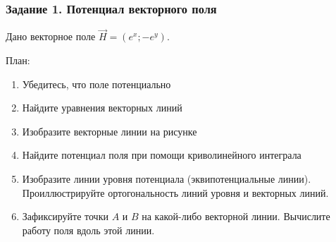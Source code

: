 \begin{frame}\frametitle{Задание 1. Потенциал векторного поля}
  Дано векторное поле \( \vec H = \left( e^x; -e^y \right) \).

План:
\begin{enumerate}
  \item Убедитесь, что поле потенциально
  \item Найдите уравнения векторных линий
  \item Изобразите векторные линии на рисунке
  \item Найдите потенциал поля при помощи криволинейного интеграла
  \item Изобразите линии уровня потенциала (эквипотенциальные линии).
  Проиллюстрируйте ортогональность линий уровня и векторных линий.
  \item Зафиксируйте точки \( A \) и \( B \) на какой-либо векторной линии.
  Вычислите работу поля вдоль этой линии.
\end{enumerate}
\end{frame}








